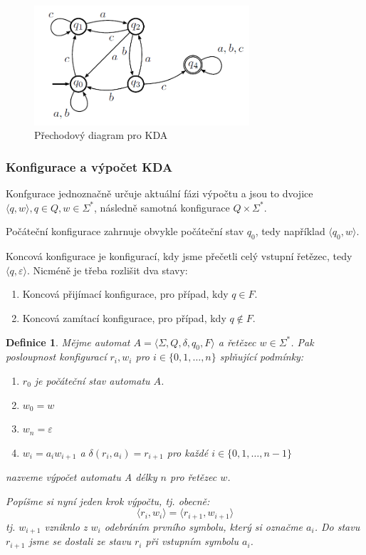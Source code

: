 \documentclass[10pt,a4paper]{article}
\theoremstyle{note}
\newtheorem{definice}{Definice}
\begin{document}
\vspace{3mm}

\begin{figure}[ht]
\begin{center}
\includegraphics[width=8cm]{img/KDA-priklad2.png}
\end{center}
\caption{Přechodový diagram pro KDA}
\end{figure}

\subsubsection{Konfigurace a výpočet KDA}

Konfgurace jednoznačně určuje aktuální fázi výpočtu a jsou to dvojice $\langle q, w \rangle, q \in Q, w \in \Sigma^*$, následně
samotná konfigurace $Q \times \Sigma^*$.

Počáteční konfigurace zahrnuje obvykle počáteční stav $q_0$, tedy například $\langle q_0, w \rangle$.

Koncová konfigurace je konfigurací, kdy jsme přečetli celý vstupní řetězec,
tedy $\langle q, \varepsilon \rangle$. Nicméně je třeba rozlišit dva stavy:
\begin{enumerate}
\item
Koncová přijímací konfigurace, pro případ, kdy $q \in F$.

\item
Koncová zamítací konfigurace, pro případ, kdy $q \notin F$.
\end{enumerate}

\begin{definice}
Mějme automat $A = \langle \Sigma, Q, \delta, q_0, F \rangle$ a řetězec $w \in \Sigma^*$. Pak posloupnost
konfigurací $r_i, w_i$ pro $i \in \lbrace 0, 1, \ldots, n \rbrace$ splňující podmínky:
\begin{enumerate}
\item
$r_0$ je počáteční stav automatu $A$.

\item
$w_0 = w$

\item
$w_n = \varepsilon$

\item \label{vypocet-bod-4}
$w_i = a_i w_{i+1}$ a $\delta(r_i, a_i) = r_{i+1}$ pro každé $i \in \lbrace 0,1,\ldots,n-1 \rbrace$
\end{enumerate}
nazveme \textit{výpočet automatu A délky $n$ pro řetězec $w$}.

Popíšme si nyní jeden krok výpočtu, tj. obecně:
$$
\langle r_i, w_i \rangle = \langle r_{i+1}, w_{i+1} \rangle
$$
tj. $w_{i+1}$ vzniknlo z $w_i$ odebráním prvního symbolu, který si označme $a_i$. Do stavu $r_{i+1}$ jsme se dostali ze
stavu $r_i$ při vstupním symbolu $a_i$.
\end{definice}
\end{document}
